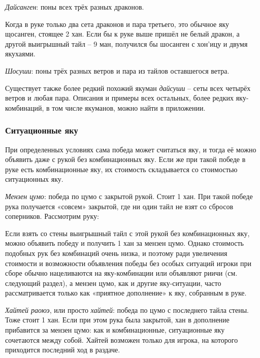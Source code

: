 \textit{Дайсанген}: поны всех трёх разных драконов.

\hfill {}

Когда в руке только два сета драконов и пара третьего, это обычное яку щосанген, стоящее 2 хан. Если бы к руке выше пришёл не белый дракон, а другой выигрышный тайл – 9 ман, получился бы шосанген с хон'ицу и двумя якухаями.

\textit{Шосуши}: поны трёх разных ветров и пара из тайлов оставшегося ветра.

\hfill {}

Существует также более редкий похожий якуман \textit{дайсуши} – сеты всех четырёх ветров и любая пара. Описания и примеры всех остальных, более редких яку-комбинаций, в том числе якуманов, можно найти в приложении. 

\subsubsection{Ситуационные яку}

При определенных условиях сама победа может считаться яку, и тогда её можно объявить даже с рукой без комбинационных яку. Если же при такой победе в руке есть комбинационные яку, их стоимость складывается со стоимостью ситуационных яку.

\textit{Мензен цумо}: победа по цумо с закрытой рукой. Стоит 1 хан. При такой победе рука получается «совсем» закрытой, где ни один тайл не взят со сбросов соперников. Рассмотрим руку:


Если взять со стены выигрышный тайл с этой рукой без комбинационных яку, можно объявить победу и получить 1 хан за мензен цумо. Однако стоимость подобных рук без комбинаций очень низка, и поэтому ради увеличения стоимости и возможности объявления победы без особых ситуаций игроки при сборе обычно нацеливаются на яку-комбинации или объявляют риичи (см. следующий раздел), а мензен цумо, как и другие яку-ситуации, часто рассматривается только как «приятное дополнение» к яку, собранным в руке.

\textit{Хайтей раоюэ}, или просто \textit{хайтей}: победа по цумо с последнего тайла стены. Тоже стоит 1 хан. Если при этом рука была закрытой, хан в дополнение прибавится за мензен цумо: как и комбинационные, ситуационные яку сочетаются между собой. Хайтей возможен только для игрока, на которого приходится последний ход в раздаче.

